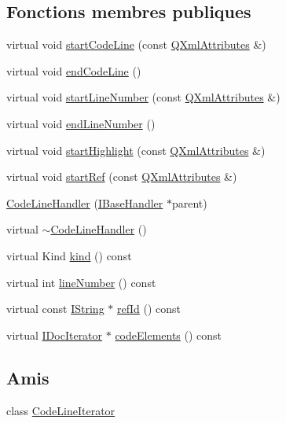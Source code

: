 \subsection*{Fonctions membres publiques}
\begin{DoxyCompactItemize}
\item 
virtual void \hyperlink{class_code_line_handler_a2058ba1d5e36e4c51d18769dad6a44c0}{start\+Code\+Line} (const \hyperlink{class_q_xml_attributes}{Q\+Xml\+Attributes} \&)
\item 
virtual void \hyperlink{class_code_line_handler_aafc6b130565fa56b0ac71c2ad8feb078}{end\+Code\+Line} ()
\item 
virtual void \hyperlink{class_code_line_handler_a8ec1bda327736e0bd25dbe031e3acf33}{start\+Line\+Number} (const \hyperlink{class_q_xml_attributes}{Q\+Xml\+Attributes} \&)
\item 
virtual void \hyperlink{class_code_line_handler_a53c77185915b3f2a7f77cbfbaf4d4e9a}{end\+Line\+Number} ()
\item 
virtual void \hyperlink{class_code_line_handler_a89f7af02258b7e149b0073ab078f6623}{start\+Highlight} (const \hyperlink{class_q_xml_attributes}{Q\+Xml\+Attributes} \&)
\item 
virtual void \hyperlink{class_code_line_handler_ab016c28ed0bf6c0c967b371e9cd58057}{start\+Ref} (const \hyperlink{class_q_xml_attributes}{Q\+Xml\+Attributes} \&)
\item 
\hyperlink{class_code_line_handler_a53b6144527ba57d79e99ee3c84044aa9}{Code\+Line\+Handler} (\hyperlink{class_i_base_handler}{I\+Base\+Handler} $\ast$parent)
\item 
virtual \hyperlink{class_code_line_handler_afffc4f4c1669bb8db325a46a8f3904ab}{$\sim$\+Code\+Line\+Handler} ()
\item 
virtual Kind \hyperlink{class_code_line_handler_a9f52ca731c7c4797588a557b12903fd0}{kind} () const 
\item 
virtual int \hyperlink{class_code_line_handler_a63e568aa4bcf9cb5759d39a78f69ae99}{line\+Number} () const 
\item 
virtual const \hyperlink{class_i_string}{I\+String} $\ast$ \hyperlink{class_code_line_handler_a75416c19f2aaa8b08ef424ecb356af1a}{ref\+Id} () const 
\item 
virtual \hyperlink{class_i_doc_iterator}{I\+Doc\+Iterator} $\ast$ \hyperlink{class_code_line_handler_aa9186efef38d83aedc664f76786a6e21}{code\+Elements} () const 
\end{DoxyCompactItemize}
\subsection*{Amis}
\begin{DoxyCompactItemize}
\item 
class \hyperlink{class_code_line_handler_a58edddfb3f15948fd8e3e8c67db55d01}{Code\+Line\+Iterator}
\end{DoxyCompactItemize}
